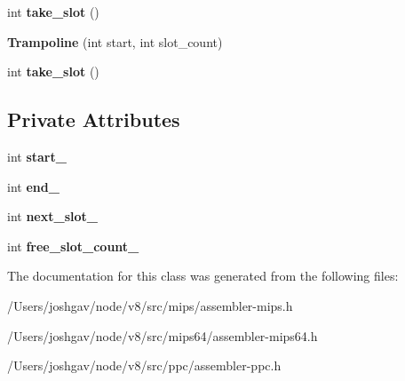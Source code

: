 \begin{DoxyCompactItemize}
\item 
int {\bfseries take\+\_\+slot} ()\hypertarget{classv8_1_1internal_1_1_assembler_1_1_trampoline_aadea2897c5eed8217284362ee9a25420}{}\label{classv8_1_1internal_1_1_assembler_1_1_trampoline_aadea2897c5eed8217284362ee9a25420}

\item 
{\bfseries Trampoline} (int start, int slot\+\_\+count)\hypertarget{classv8_1_1internal_1_1_assembler_1_1_trampoline_a842cc1ad9d3a29292e7741da5fa35c87}{}\label{classv8_1_1internal_1_1_assembler_1_1_trampoline_a842cc1ad9d3a29292e7741da5fa35c87}

\item 
int {\bfseries take\+\_\+slot} ()\hypertarget{classv8_1_1internal_1_1_assembler_1_1_trampoline_aadea2897c5eed8217284362ee9a25420}{}\label{classv8_1_1internal_1_1_assembler_1_1_trampoline_aadea2897c5eed8217284362ee9a25420}

\end{DoxyCompactItemize}
\subsection*{Private Attributes}
\begin{DoxyCompactItemize}
\item 
int {\bfseries start\+\_\+}\hypertarget{classv8_1_1internal_1_1_assembler_1_1_trampoline_a078bdb4a6f56ad03152c83becf2703f7}{}\label{classv8_1_1internal_1_1_assembler_1_1_trampoline_a078bdb4a6f56ad03152c83becf2703f7}

\item 
int {\bfseries end\+\_\+}\hypertarget{classv8_1_1internal_1_1_assembler_1_1_trampoline_a0361f6b4cd097e8bd518ecf4e091ed88}{}\label{classv8_1_1internal_1_1_assembler_1_1_trampoline_a0361f6b4cd097e8bd518ecf4e091ed88}

\item 
int {\bfseries next\+\_\+slot\+\_\+}\hypertarget{classv8_1_1internal_1_1_assembler_1_1_trampoline_a4b1f411bb667980ca9fad72b80dfc8b1}{}\label{classv8_1_1internal_1_1_assembler_1_1_trampoline_a4b1f411bb667980ca9fad72b80dfc8b1}

\item 
int {\bfseries free\+\_\+slot\+\_\+count\+\_\+}\hypertarget{classv8_1_1internal_1_1_assembler_1_1_trampoline_a84ff9222d7397328afa95e8db223aaae}{}\label{classv8_1_1internal_1_1_assembler_1_1_trampoline_a84ff9222d7397328afa95e8db223aaae}

\end{DoxyCompactItemize}


The documentation for this class was generated from the following files\+:\begin{DoxyCompactItemize}
\item 
/\+Users/joshgav/node/v8/src/mips/assembler-\/mips.\+h\item 
/\+Users/joshgav/node/v8/src/mips64/assembler-\/mips64.\+h\item 
/\+Users/joshgav/node/v8/src/ppc/assembler-\/ppc.\+h\end{DoxyCompactItemize}
